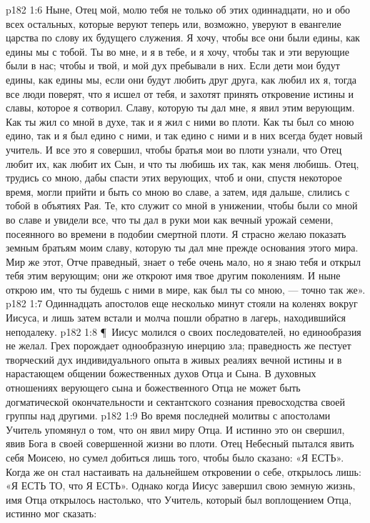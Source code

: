\vs p182 1:6 Ныне, Отец мой, молю тебя не только об этих одиннадцати, но и обо всех остальных, которые веруют теперь или, возможно, уверуют в евангелие царства по слову их будущего служения. Я хочу, чтобы все они были едины, как едины мы с тобой. Ты во мне, и я в тебе, и я хочу, чтобы так и эти верующие были в нас; чтобы и твой, и мой дух пребывали в них. Если дети мои будут едины, как едины мы, если они будут любить друг друга, как любил их я, тогда все люди поверят, что я исшел от тебя, и захотят принять откровение истины и славы, которое я сотворил. Славу, которую ты дал мне, я явил этим верующим. Как ты жил со мной в духе, так и я жил с ними во плоти. Как ты был со мною едино, так и я был едино с ними, и так едино с ними и в них всегда будет новый учитель. И все это я совершил, чтобы братья мои во плоти узнали, что Отец любит их, как любит их Сын, и что ты любишь их так, как меня любишь. Отец, трудись со мною, дабы спасти этих верующих, чтоб и они, спустя некоторое время, могли прийти и быть со мною во славе, а затем, идя дальше, слились с тобой в объятиях Рая. Те, кто служит со мной в унижении, чтобы были со мной во славе и увидели все, что ты дал в руки мои как вечный урожай семени, посеянного во времени в подобии смертной плоти. Я страсно желаю показать земным братьям моим славу, которую ты дал мне прежде основания этого мира. Мир же этот, Отче праведный, знает о тебе очень мало, но я знаю тебя и открыл тебя этим верующим; они же откроют имя твое другим поколениям. И ныне открою им, что ты будешь с ними в мире, как был ты со мною, --- точно так же».
\vs p182 1:7 Одиннадцать апостолов еще несколько минут стояли на коленях вокруг Иисуса, и лишь затем встали и молча пошли обратно в лагерь, находившийся неподалеку.
\vs p182 1:8 \P\ Иисус молился о  своих последователей, но единообразия не желал. Грех порождает однообразную инерцию зла; праведность же пестует творческий дух индивидуального опыта в живых реалиях вечной истины и в нарастающем общении божественных духов Отца и Сына. В духовных отношениях верующего сына и божественного Отца не может быть догматической окончательности и сектантского сознания превосходства своей группы над другими.
\vs p182 1:9 Во время последней молитвы с апостолами Учитель упомянул о том, что он явил миру  Отца. И истинно это он свершил, явив Бога в своей совершенной жизни во плоти. Отец Небесный пытался явить себя Моисею, но сумел добиться лишь того, чтобы было сказано: «Я ЕСТЬ». Когда же он стал настаивать на дальнейшем откровении о себе, открылось лишь: «Я ЕСТЬ ТО, что Я ЕСТЬ». Однако когда Иисус завершил свою земную жизнь, имя Отца открылось настолько, что Учитель, который был воплощением Отца, истинно мог сказать:
